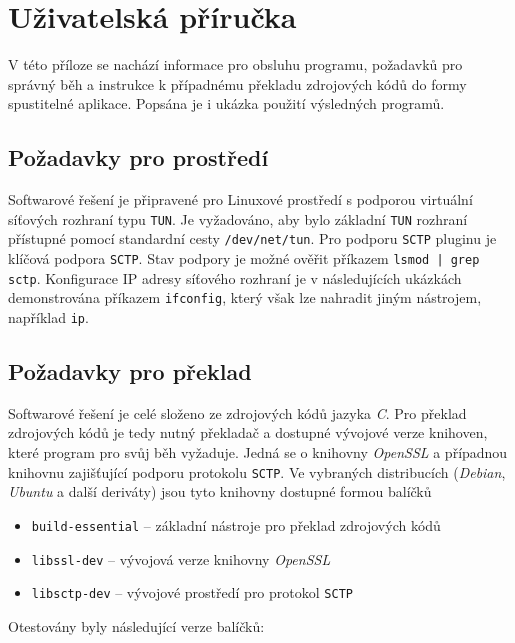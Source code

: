 \documentclass[thesis=M,czech]{FITthesis}[2012/10/20]
\begin{document}
\appendix

\chapter{Uživatelská příručka}

V této příloze se nachází informace pro obsluhu programu, požadavků pro správný běh a instrukce k případnému překladu zdrojových kódů do formy spustitelné aplikace. Popsána je i ukázka použití výsledných programů.

\section{Požadavky pro prostředí}

Softwarové řešení je připravené pro Linuxové prostředí s podporou virtuální síťových rozhraní typu \texttt{TUN}. Je vyžadováno, aby bylo základní \texttt{TUN} rozhraní přístupné pomocí standardní cesty \texttt{/dev/net/tun}. Pro podporu \texttt{SCTP} pluginu je klíčová podpora \texttt{SCTP}. Stav podpory je možné ověřit příkazem \verb=lsmod | grep sctp=. Konfigurace IP adresy síťového rozhraní je v následujících ukázkách demonstrována příkazem \texttt{ifconfig}, který však lze nahradit jiným nástrojem, například \texttt{ip}.

\section{Požadavky pro překlad}

Softwarové řešení je celé složeno ze zdrojových kódů jazyka \textit{C}. Pro překlad zdrojových kódů je tedy nutný překladač a dostupné vývojové verze knihoven, které program pro svůj běh vyžaduje. Jedná se o knihovny \textit{OpenSSL} a případnou knihovnu zajišťující podporu protokolu \texttt{SCTP}. Ve vybraných distribucích (\textit{Debian}, \textit{Ubuntu} a další deriváty) jsou tyto knihovny dostupné formou balíčků

\begin{itemize}
 \item \texttt{build-essential} -- základní nástroje pro překlad zdrojových kódů
 \item \texttt{libssl-dev} -- vývojová verze knihovny \textit{OpenSSL}
 \item \texttt{libsctp-dev} -- vývojové prostředí pro protokol \texttt{SCTP}
\end{itemize}

Otestovány byly následující verze balíčků:
\end{document}
